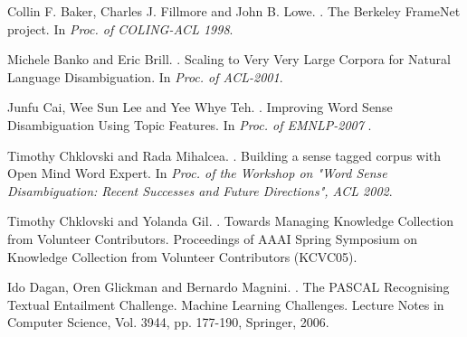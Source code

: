 \documentclass[11pt]{article}
\begin{document}

\begin{thebibliography}{}%


Collin F. Baker, Charles J. Fillmore and John B. Lowe.
.
\newblock The Berkeley FrameNet project. 
\newblock In \textit{Proc. of COLING-ACL 1998}.

Michele Banko and Eric Brill.
.
\newblock Scaling to Very Very Large Corpora for Natural Language Disambiguation.
\newblock In \textit{Proc. of ACL-2001}.

Junfu Cai, Wee Sun Lee and Yee Whye Teh.
.
\newblock Improving Word Sense Disambiguation Using Topic Features.
\newblock In \textit{ Proc. of EMNLP-2007 }.

Timothy Chklovski and Rada Mihalcea.
.
\newblock Building a sense tagged corpus with Open Mind Word Expert. 
\newblock In \textit{ Proc. of the Workshop on "Word Sense Disambiguation: Recent Successes and Future Directions", ACL 2002}.

Timothy Chklovski and Yolanda Gil.
.
\newblock Towards Managing Knowledge Collection from Volunteer Contributors.
\newblock Proceedings of AAAI Spring Symposium on Knowledge Collection from Volunteer Contributors (KCVC05).


Ido Dagan, Oren Glickman and Bernardo Magnini. 
.
\newblock The PASCAL Recognising Textual Entailment Challenge. 
\newblock Machine Learning Challenges. Lecture Notes in Computer Science, Vol. 3944, pp. 177-190, Springer, 2006.


\end{thebibliography}
\end{document}
